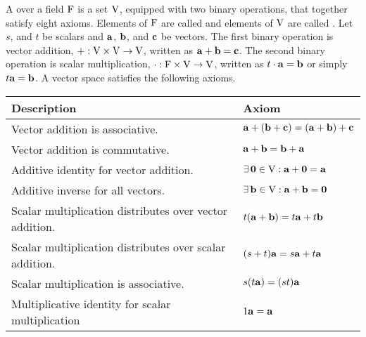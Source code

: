 \documentclass[oneside]{memoir}
\begin{document}
\begin{definition} 
A  over a field $\mathrm{F}$ is a set $\mathrm{V}$, equipped
with two binary operations, that together satisfy eight axioms. Elements of 
$\mathrm{F}$ are called  and elements of $\mathrm{V}$ are called
. Let $s$, and $t$ be scalars and $\mathbf{a}$, $\mathbf{b}$,
and $\mathbf{c}$ be vectors. The first binary operation is vector addition, $+ :
\mathrm{V} \times \mathrm{V} \to \mathrm{V}$, written as $\mathbf{a} + \mathbf{b} =
\mathbf{c}$.
The second binary operation is scalar multiplication, $\cdot : \mathrm{F} \times
\mathrm{V} \to \mathrm{V}$, written as $t \cdot \mathbf{a} = \mathbf{b}$ or
simply $t\mathbf{a} = \mathbf{b}$. A vector space satisfies the following
axioms.

\vspace{1em}

\noindent\begin{tabularx}{\textwidth}{lX}
\toprule 
Description & Axiom \\  
\midrule
Vector addition is associative. & $\mathbf{a} + (\mathbf{b} + \mathbf{c}) =
(\mathbf{a} + \mathbf{b}) + \mathbf{c}$ \\

Vector addition is commutative. & $\mathbf{a} + \mathbf{b} = \mathbf{b} +
\mathbf{a}$ \\

Additive identity for vector addition. & $\exists \, \mathbf{0}
\in \mathrm{V} :
\mathbf{a}+\mathbf{0}=\mathbf{a}$\\

Additive inverse for all vectors. & $\exists \, \mathbf{b} \in
\mathrm{V} : \mathbf{a}+\mathbf{b} = \mathbf{0}$ \\

Scalar multiplication distributes over vector addition. & $t(\mathbf{a} +
\mathbf{b}) = t\mathbf{a} + t\mathbf{b}$ 
\\

Scalar multiplication distributes over scalar addition. & $(s + t)\mathbf{a} =
s\mathbf{a} + t\mathbf{a}$
\\

Scalar multiplication is associative. & $s(t\mathbf{a}) = (st) \mathbf{a}$ \\

Multiplicative identity for scalar multiplication & $1\mathbf{a} = \mathbf{a}$ \\
\bottomrule
\end{tabularx}  
\end{definition}
\end{document}
